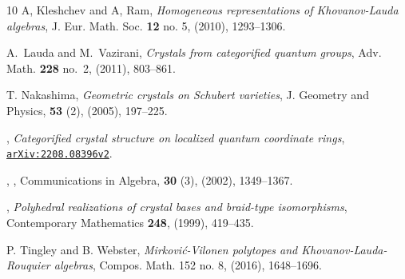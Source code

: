 \documentclass[12pt,leqno]{amsart}%
\newcommand{\arxiv}[1]{\href{http://arxiv.org/abs/#1}{\texttt{arXiv:#1}}}
\theoremstyle{plain}
\theoremstyle{definition}
\numberwithin{equation}{section}
\begin{document}
\begin{thebibliography}{10}
A, Kleshchev and A, Ram,
{\em Homogeneous representations of Khovanov-Lauda algebras},
J. Eur. Math. Soc. {\bf 12} no. 5, (2010), 1293--1306.

A.~Lauda and M.~Vazirani, \emph{Crystals from categorified quantum groups},
  Adv. Math. \textbf{228} no.~2,  (2011), 803--861.












T. Nakashima, \emph{Geometric crystals on Schubert varieties}, 
             J. Geometry and Physics, {\bf 53} (2), (2005), 197--225.


\bysame,
{\em Categorified crystal structure on localized quantum coordinate rings},
\arxiv{2208.08396v2}.

  \bysame,
  , Communications in Algebra, 
            {\bf 30} (3), (2002), 1349--1367.


  \bysame,
  {\em Polyhedral realizations of 
           crystal bases and braid-type isomorphisms}, 
           Contemporary Mathematics {\bf 248}, (1999), 419--435.



P. Tingley and B. Webster,
{\em Mirkovi\'c-Vilonen polytopes and Khovanov-Lauda-Rouquier algebras},
Compos. Math. 152 no. 8,  (2016), 1648--1696.


\end{thebibliography}
\end{document}
